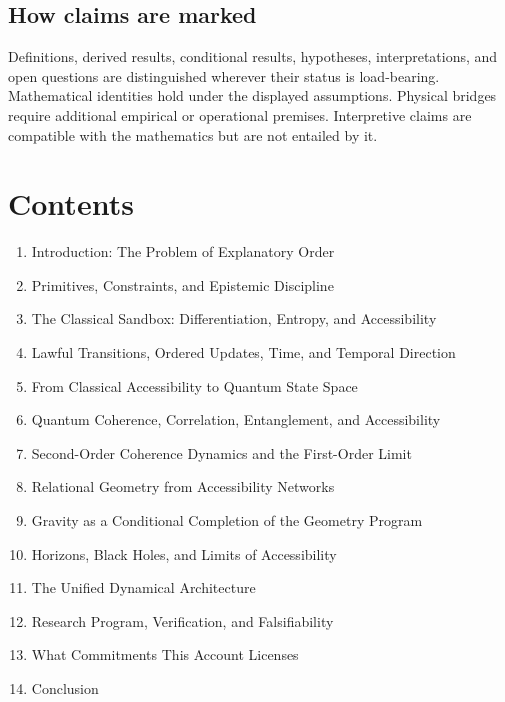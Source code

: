\documentclass[
  11pt,
]{article}
\providecommand{\tightlist}{%
  \setlength{\itemsep}{0pt}\setlength{\parskip}{0pt}}
\begin{document}
\subsection{How claims are marked}\label{how-claims-are-marked}

Definitions, derived results, conditional results, hypotheses,
interpretations, and open questions are distinguished wherever their
status is load-bearing. Mathematical identities hold under the displayed
assumptions. Physical bridges require additional empirical or
operational premises. Interpretive claims are compatible with the
mathematics but are not entailed by it.

\section{Contents}\label{contents}

\begin{enumerate}
\def\labelenumi{\arabic{enumi}.}
\tightlist
\item
  Introduction: The Problem of Explanatory Order\\
\item
  Primitives, Constraints, and Epistemic Discipline\\
\item
  The Classical Sandbox: Differentiation, Entropy, and Accessibility\\
\item
  Lawful Transitions, Ordered Updates, Time, and Temporal Direction\\
\item
  From Classical Accessibility to Quantum State Space\\
\item
  Quantum Coherence, Correlation, Entanglement, and Accessibility\\
\item
  Second-Order Coherence Dynamics and the First-Order Limit\\
\item
  Relational Geometry from Accessibility Networks\\
\item
  Gravity as a Conditional Completion of the Geometry Program\\
\item
  Horizons, Black Holes, and Limits of Accessibility\\
\item
  The Unified Dynamical Architecture\\
\item
  Research Program, Verification, and Falsifiability\\
\item
  What Commitments This Account Licenses\\
\item
  Conclusion
\end{enumerate}
\end{document}
